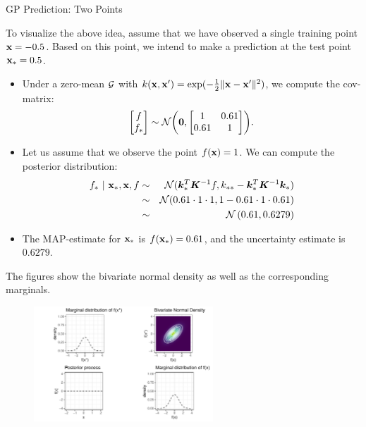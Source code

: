 \begin{frame}[c,allowframebreaks]{GP Prediction: Two Points}

To visualize the above idea, assume that we have observed a single training point $\mathbf{x} = - 0.5$. Based on this point, we intend to make a prediction at the test point $\mathbf{x}_* = 0.5$.

\vspace{3mm}

\begin{itemize}
  \item Under a zero-mean $\mathcal{G}$ with $k(\mathbf{x}, \mathbf{x}^\prime) = \exp(-\frac{1}{2}\|\mathbf{x} - \mathbf{x}^\prime\|^2)$, we compute the cov-matrix:
  \vspace{-3mm}
  $$\begin{bmatrix} f \\ f_* \end{bmatrix} \sim \mathcal{N}\biggl(\bm{0}, \begin{bmatrix} 1 & 0.61 \\ 0.61 & 1\end{bmatrix}\biggr).$$ 
  \item Let us assume that we observe the point $f(\mathbf{x}) = 1$. We can compute the posterior distribution:
\vspace{-5mm}
  \begin{eqnarray*}
    f_* ~|~ \mathbf{x}_*, \mathbf{x}, f &\sim& \mathcal{N}(\bm{k}_{*}^{T}\bm{K}^{-1}f, k_{**} - \bm{k}_*^T \bm{K}^{-1}\bm{k}_*) \\
    &\sim& \mathcal{N}(0.61 \cdot 1 \cdot 1, 1 - 0.61 \cdot 1 \cdot 0.61) \\
    &\sim& \mathcal{N}\left(0.61, 0.6279\right) 
  \end{eqnarray*}
  \item The MAP-estimate for $\mathbf{x}_*$ is $f(\mathbf{x}_*) = 0.61$, and the uncertainty estimate is $0.6279$.

\end{itemize}

\framebreak


The figures show the bivariate normal density as well as the corresponding marginals. 


\begin{figure}
\includegraphics[width=0.6\textwidth]{figure/gp-posterior-1-1.pdf}\par
\end{figure}


\end{frame}
